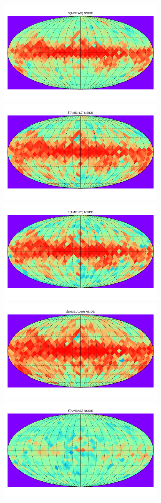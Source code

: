       \begin{figure}
        \label{fig:Spearman_Map_nside8_AMEto}
        \includegraphics[width=80mm]{../Plots/Allsky_Corr/Spearman_Map_nside8_AMEtoA9.pdf}
        \includegraphics[width=80mm]{../Plots/Allsky_Corr/Spearman_Map_nside8_AMEtoI12.pdf}
        \includegraphics[width=80mm]{../Plots/Allsky_Corr/Spearman_Map_nside8_AMEtoI25.pdf}
        \includegraphics[width=80mm]{../Plots/Allsky_Corr/Spearman_Map_nside8_AMEtoA140.pdf}
        \includegraphics[width=80mm]{../Plots/Allsky_Corr/RadNorm/Spearman_Map_nside8_AMEtoA9.pdf}

\end{figure}

